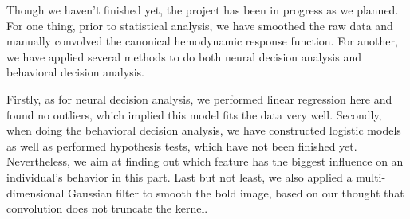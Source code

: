 \par \indent Though we haven't finished yet, the project has been in progress
as we planned. For one thing, prior to statistical analysis, we have smoothed 
the raw data and manually convolved the canonical hemodynamic response 
function. For another, we have applied several methods to do both neural 
decision analysis and behavioral decision analysis.

\par \indent Firstly, as for neural decision analysis, we performed linear
regression here and found no outliers, which implied this model fits the data
very well. Secondly, when doing the behavioral decision analysis, we have
constructed logistic models as well as performed hypothesis tests, which 
have not been finished yet. Nevertheless, we aim at finding out which feature 
has the biggest influence on an individual's behavior in this part. Last but 
not least, we also applied a multi-dimensional Gaussian filter to smooth the
bold image, based on our thought that convolution does not truncate the kernel.
